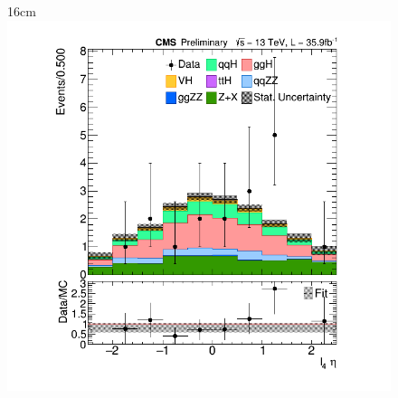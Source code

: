 \begin{figure}[hbtp]{16cm}
{		\includegraphics[scale=0.23,trim={2cm 1cm 2cm 1cm},clip]{ChapterAnalysis/figs/vbf_l4_eta}
	}
\end{figure}

